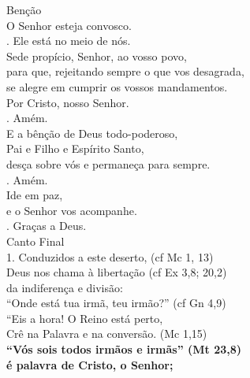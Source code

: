 \documentclass{book}
\begin{document}
\begin{flushleft}
    \textcolor{VioletRed2}{Benção}
    \vspace{.2cm} \\
    O Senhor esteja convosco.
    \vspace{.2cm} \\
    {\color{VioletRed2} \Rbar.} Ele está no meio de nós.
    \vspace{.2cm} \\
    Sede propício, Senhor, ao vosso povo, \\
    para que, rejeitando sempre o que vos desagrada, \\
    se alegre em cumprir os vossos mandamentos. \\
    Por Cristo, nosso Senhor. \\
    {\color{VioletRed2} \Rbar.} Amém.
    \vspace{.2cm} \\
    E a bênção de Deus todo-poderoso, \\
    Pai e Filho \grecrossRed{} e Espírito Santo, \\
    desça sobre vós e permaneça para sempre.
    \vspace{.2cm} \\
    {\color{VioletRed2} \Rbar.} Amém.
    \vspace{.2cm} \\
    Ide em paz, \\
    e o Senhor vos acompanhe.
    \vspace{.2cm} \\
    {\color{VioletRed2} \Rbar.} Graças a Deus.
    \vspace{.2cm} \\
    \textcolor{VioletRed2}{Canto Final}
    \vspace{.2cm} \\
    1. Conduzidos a este deserto, (cf Mc 1, 13) \\
    Deus nos chama à libertação (cf Ex 3,8; 20,2) \\
    da indiferença e divisão: \\
    “Onde está tua irmã, teu irmão?” (cf Gn 4,9) \\
    “Eis a hora! O Reino está perto, \\
    Crê na Palavra e na conversão. (Mc 1,15)
    \vspace{.2cm} \\
    \textbf{“Vós sois todos irmãos e irmãs” (Mt 23,8) \\
        é palavra de Cristo, o Senhor; \\
}
\end{flushleft}
\end{document}
